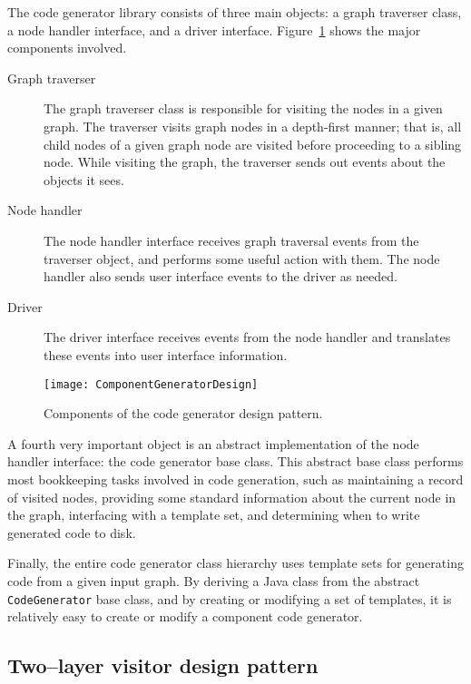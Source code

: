 The code generator library consists of three main objects: a graph traverser
class, a node handler interface, and a driver interface.
Figure~\ref{fig:component-generator-design} shows the major components involved.

\begin{description}
\item [Graph traverser] The graph traverser class is responsible for visiting
      the nodes in a given graph. The traverser visits graph nodes in a
      depth-first manner; that is, all child nodes of a given graph node are
      visited before proceeding to a sibling node. While visiting the graph, the
      traverser sends out events about the objects it sees.
\item [Node handler] The node handler interface receives graph traversal events
      from the traverser object, and performs some useful action with them. The
      node handler also sends user interface events to the driver as needed.
\item [Driver] The driver interface receives events from the node handler and
      translates these events into user interface information.
\end{description}

\begin{figure}[!htb]
\centering
\texttt{[image: ComponentGeneratorDesign]}
\caption{Components of the code generator design pattern.}
\label{fig:component-generator-design}
\end{figure}

A fourth very important object is an abstract implementation of the node handler
interface: the code generator base class. This abstract base class performs most
bookkeeping tasks involved in code generation, such as maintaining a record of
visited nodes, providing some standard information about the current node in the
graph, interfacing with a template set, and determining when to write generated
code to disk.

Finally, the entire code generator class hierarchy uses template sets for
generating code from a given input graph. By deriving a Java class from the
abstract {\tt CodeGenerator} base class, and by creating or modifying a set of
templates, it is relatively easy to create or modify a component code generator.

\subsection{Two--layer visitor design pattern}

